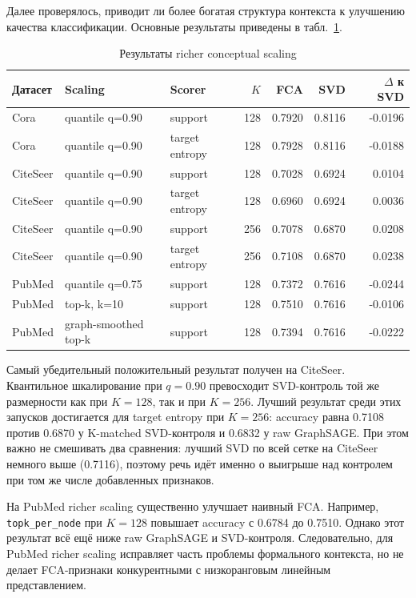 \documentclass[14pt,a4paper]{extarticle}
\begin{document}
Далее проверялось, приводит ли более богатая структура контекста к улучшению
качества классификации. Основные результаты приведены в табл.~\ref{tab:richer}.

\begin{table}[H]
\centering
\caption{Результаты richer conceptual scaling}
\label{tab:richer}
\begin{tabular}{lllrrrr}
\toprule
Датасет & Scaling & Scorer & $K$ & FCA & SVD & $\Delta$ к SVD \\
\midrule
Cora & quantile q=0.90 & support & 128 & 0.7920 & 0.8116 & -0.0196 \\
Cora & quantile q=0.90 & target entropy & 128 & 0.7928 & 0.8116 & -0.0188 \\
\midrule
CiteSeer & quantile q=0.90 & support & 128 & 0.7028 & 0.6924 & 0.0104 \\
CiteSeer & quantile q=0.90 & target entropy & 128 & 0.6960 & 0.6924 & 0.0036 \\
CiteSeer & quantile q=0.90 & support & 256 & 0.7078 & 0.6870 & 0.0208 \\
CiteSeer & quantile q=0.90 & target entropy & 256 & 0.7108 & 0.6870 & 0.0238 \\
\midrule
PubMed & quantile q=0.75 & support & 128 & 0.7372 & 0.7616 & -0.0244 \\
PubMed & top-k, k=10 & support & 128 & 0.7510 & 0.7616 & -0.0106 \\
PubMed & graph-smoothed top-k & support & 128 & 0.7394 & 0.7616 & -0.0222 \\
\bottomrule
\end{tabular}
\end{table}

Самый убедительный положительный результат получен на CiteSeer. Квантильное
шкалирование при $q=0.90$ превосходит SVD-контроль той же размерности как при
$K=128$, так и при $K=256$. Лучший результат среди этих запусков достигается для
target entropy при $K=256$: accuracy равна 0.7108 против 0.6870 у
K-matched SVD-контроля и 0.6832 у raw GraphSAGE. При этом важно не смешивать два
сравнения: лучший SVD по всей сетке на CiteSeer немного выше (0.7116), поэтому
речь идёт именно о выигрыше над контролем при том же числе добавленных признаков.

На PubMed richer scaling существенно улучшает наивный FCA. Например,
\texttt{topk\_per\_node} при $K=128$ повышает accuracy с 0.6784 до 0.7510.
Однако этот результат всё ещё ниже raw GraphSAGE и SVD-контроля. Следовательно,
для PubMed richer scaling исправляет часть проблемы формального контекста, но
не делает FCA-признаки конкурентными с низкоранговым линейным представлением.
\end{document}
